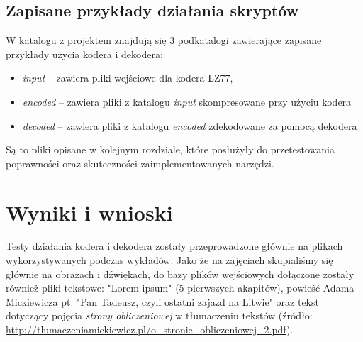 \documentclass{article}
\begin{document}
\subsection{Zapisane przykłady działania skryptów}
W katalogu z projektem znajdują się 3 podkatalogi zawierające zapisane przykłady użycia kodera i dekodera:
\begin{itemize}
    \item \textit{input} -- zawiera pliki wejściowe dla kodera LZ77,
    \item \textit{encoded} -- zawiera pliki z katalogu \textit{input} skompresowane przy użyciu kodera
    \item \textit{decoded} -- zawiera pliki z katalogu \textit{encoded} zdekodowane za pomocą dekodera
\end{itemize}
Są to pliki opisane w kolejnym rozdziale, które posłużyły do przetestowania poprawności oraz skuteczności zaimplementowanych narzędzi.

\section{Wyniki i wnioski}
Testy działania kodera i dekodera zostały przeprowadzone głównie na plikach wykorzystywanych podczas wykładów. Jako że na zajęciach skupialiśmy się głównie na obrazach i dźwiękach, do bazy plików wejściowych dołączone zostały również pliki tekstowe: "Lorem ipsum" (5 pierwszych akapitów), powieść Adama Mickiewicza pt. "Pan Tadeusz, czyli ostatni zajazd na Litwie" oraz tekst dotyczący pojęcia \textit{strony obliczeniowej} w tłumaczeniu tekstów (źródło: \url{http://tlumaczeniamickiewicz.pl/o_stronie_obliczeniowej_2.pdf}).
\end{document}
